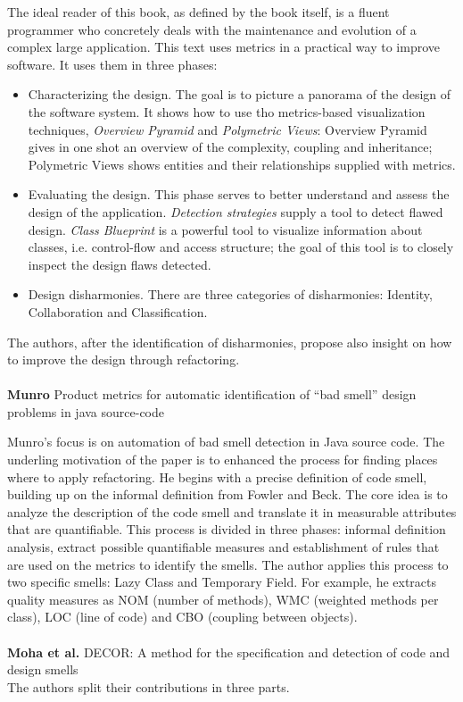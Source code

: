 The ideal reader of this book, as defined by the book itself, is a fluent programmer who concretely deals with the maintenance and evolution of a complex large application.
This text uses metrics in a practical way to improve software. It uses them in three phases:
\begin{itemize}
    \item Characterizing the design. The goal is to picture a panorama of the design of the software system. It shows how to use tho metrics-based visualization techniques, \emph{Overview Pyramid} and \emph{Polymetric Views}: Overview Pyramid gives in one shot an overview of the complexity, coupling and inheritance; Polymetric Views shows entities and their relationships supplied with metrics.
    \item Evaluating the design. This phase serves to better understand and assess the design of the application. \emph{Detection strategies} \cite{marinescu2004detection} supply a tool to detect flawed design. \emph{Class Blueprint} is a powerful tool to visualize information about classes, i.e. control-flow and access structure; the goal of this tool is to closely inspect the design flaws detected.
    \item Design disharmonies. There are three categories of disharmonies: Identity, Collaboration and Classification. 
\end{itemize}

The authors, after the identification of disharmonies, propose also insight on how to improve the design through refactoring.
\\
\\
\textbf{Munro} \cite{munro2005product} Product metrics for automatic identification of ``bad smell'' design problems in java source-code

Munro's focus is on automation of bad smell detection in Java source code. The underling motivation of the paper is to enhanced the process for finding places where to apply refactoring. He begins with a precise definition of code smell, building up on the informal definition from Fowler and Beck. The core idea is to analyze the description of the code smell and translate it in measurable attributes that are quantifiable. This process is divided in three phases: informal definition analysis, extract possible quantifiable measures and establishment of rules that are used on the metrics to identify the smells. 
The author applies this process to two specific smells: Lazy Class and Temporary Field. For example, he extracts quality measures as NOM (number of methods), WMC (weighted methods per class), LOC (line of code) and CBO (coupling between objects).
\\
\\
\textbf{Moha et al.} \cite{moha2009decor} DECOR: A method for the specification and detection of code and design smells
\\
The authors split their contributions in three parts. 

